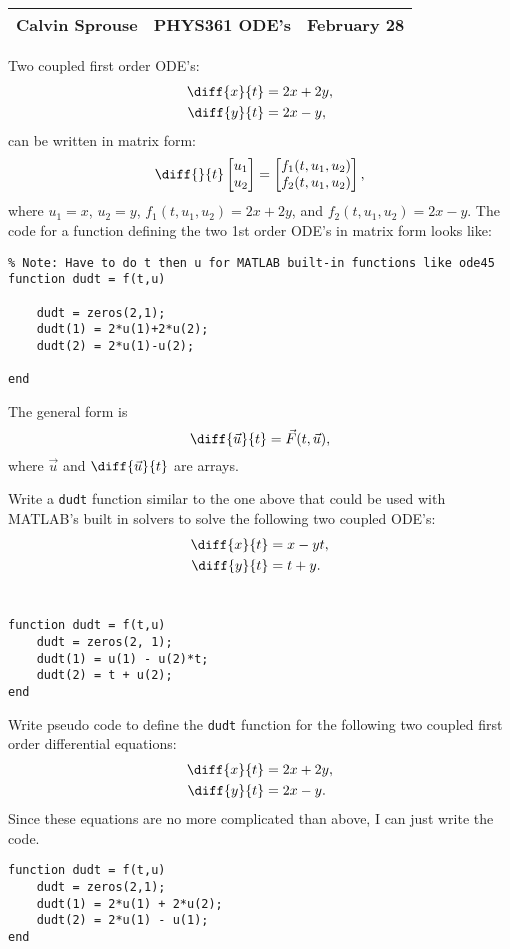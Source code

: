 \documentclass[a4paper, 12pt]{config/homework}
\begin{document}
\noindent
\begin{tabularx}{\textwidth}{>{\centering\arraybackslash}X>{\centering\arraybackslash}X>{\centering\arraybackslash}X}
Calvin Sprouse & PHYS361 ODE's & 2024 February 28\\
\midrule
\end{tabularx}

\vspace{\baselineskip}\noindent
Two coupled first order ODE's:
\begin{align*}
\diff{x}{t} &= 2x + 2y, \\
\diff{y}{t} &= 2x - y,
\end{align*}
can be written in matrix form:
\[ \diff{}{t}\matr{u_1 \\ u_2} = \matr{f_1(t,u_1,u_2)\\ f_2(t,u_1,u_2)},\]
where \(u_1=x\), \(u_2=y\), \(f_1(t,u_1,u_2)=2x+2y\), and \(f_2(t,u_1,u_2)=2x-y\). The code for a function defining the two 1st order ODE's in matrix form looks like:
\begin{verbatim}
% Note: Have to do t then u for MATLAB built-in functions like ode45
function dudt = f(t,u)

    dudt = zeros(2,1);
    dudt(1) = 2*u(1)+2*u(2);
    dudt(2) = 2*u(1)-u(2);

end
\end{verbatim}
The general form is
\[\diff{\vec{u}}{t} = \vec{F}(t,\vec{u}),\]
where \(\vec{u}\) and \(\diff{\vec{u}}{t}\) are arrays.

\vspace{\baselineskip}\noindent
Write a \texttt{dudt} function similar to the one above that could be used with MATLAB's built in solvers to solve the following two coupled ODE's:
\begin{align*}
\diff{x}{t} &= x -yt,
\\ \diff{y}{t} &= t + y.
\end{align*}
\\
\begin{verbatim}
function dudt = f(t,u)
    dudt = zeros(2, 1);
    dudt(1) = u(1) - u(2)*t;
    dudt(2) = t + u(2);
end
\end{verbatim}

\vspace{\baselineskip}\noindent
Write pseudo code to define the \texttt{dudt} function for the following two coupled first order differential equations:
\begin{align*}
\diff{x}{t} &= 2x + 2y, \\
\diff{y}{t} &= 2x - y.
\end{align*}
Since these equations are no more complicated than above, I can just write the code.
\begin{verbatim}
function dudt = f(t,u)
    dudt = zeros(2,1);
    dudt(1) = 2*u(1) + 2*u(2);
    dudt(2) = 2*u(1) - u(1);
end
\end{verbatim}
\end{document}

